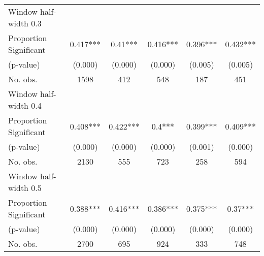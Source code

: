 \begin{tabular}{l*{5}{c}}
\hline
Window half-width 0.3\\

Proportion Significant& 0.417*** &  0.41*** &  0.416*** &  0.396*** &  0.432***\\

(p-value) & (0.000) &  (0.000) &  (0.000) &  (0.005) &  (0.005)\\

No. obs.& 1598 &  412 &  548 &  187 &  451\\

\hline
Window half-width 0.4\\

Proportion Significant& 0.408*** &  0.422*** &  0.4*** &  0.399*** &  0.409***\\

(p-value) & (0.000) &  (0.000) &  (0.000) &  (0.001) &  (0.000)\\

No. obs.& 2130 &  555 &  723 &  258 &  594\\

\hline
Window half-width 0.5\\

Proportion Significant& 0.388*** &  0.416*** &  0.386*** &  0.375*** &  0.37***\\

(p-value) & (0.000) &  (0.000) &  (0.000) &  (0.000) &  (0.000)\\

No. obs.& 2700 &  695 &  924 &  333 &  748\\

\hline\hline
\end{tabular}

